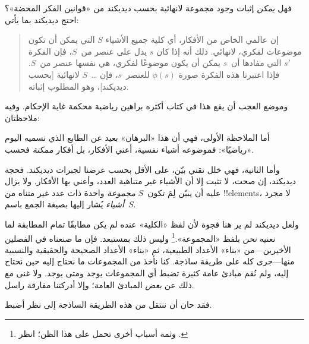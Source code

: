 \documentclass[../../../include/open-logic-section]{subfiles}
\begin{document}
فهل \emph{يمكن} إثبات وجود مجموعة لانهائية بحسب ديديكند من «قوانين الفكر المحضة»؟ احتج ديديكند بما يأتي:
\begin{quote}
  إن عالمي الخاص من الأفكار، أي كلية جميع الأشياء $S$ التي يمكن أن
  تكون موضوعات لفكري، لانهائي. ذلك أنه إذا كان $s$ يدل على عنصر
  من~$S$، فإن الفكرة $s'$ التي مفادها أن~$s$ يمكن أن يكون موضوعًا
  لفكري، هي نفسها عنصر من~$S$. فإذا اعتبرنا هذه الفكرة صورة
  $\phi(s)$ للعنصر~$s$، فإن \dots~$S$ لانهائية [بحسب ديديكند]، وهو
  المطلوب إثباته.
	\citep[\S66]{Dedekind1888}
\end{quote}
وموضع العجب أن يقع هذا في كتاب أكثره براهين رياضية محكمة غاية الإحكام. وفيه ملاحظتان:

أما الملاحظة الأولى، فهي أن هذا «البرهان» بعيد عن الطابع الذي نسميه اليوم «رياضيًا»: فموضوعه أشياء نفسية، أعني الأفكار، بل أفكار
\emph{ممكنة} فحسب.

وأما الثانية، فهي خلل تقني بيّن، على الأقل بحسب عرضنا لجبرات ديديكند. فحجة ديديكند، إن صحت، لا تثبت إلا أن الأشياء غير متناهية العدد، وأعني بها الأفكار. ولا يزال عليه أن يبيّن لِمَ تكون~$S$
\emph{مجموعة} واحدة ذات عدد غير متناه من
!!{element}s، لا مجرد \emph{أشياء} يُشار إليها بصيغة الجمع باسم~$S$.

ولعل ديديكند لم ير هنا فجوة لأن لفظ «الكلية» عنده لم يكن مطابقًا تمام المطابقة لما نعنيه \emph{نحن} بلفظ «المجموعة».\footnote{وثمة أسباب أخرى تحمل على هذا الظن؛ انظر
\citet[ص~23]{Potter2004}.} وليس ذلك بمستبعد. فإن ما صنعناه في الفصلين الأخيرين---من «بناء» الأعداد الطبيعية، ثم «بناء» الأعداد الصحيحة والحقيقية والنسبية منها---جرى كله على طريقة ساذجة. كنا نأخذ من المجموعات ما نحتاج إليه حين نحتاج إليه، ولم نُقم مبادئ عامة كثيرة تضبط أي المجموعات يوجد ومتى يوجد. ولا غنى مع ذلك عن \emph{بعض} المبادئ العامة؛ وإلا أدركتنا مفارقة راسل.

فقد حان أن ننتقل من هذه الطريقة الساذجة إلى نظر أضبط.
\end{document}
